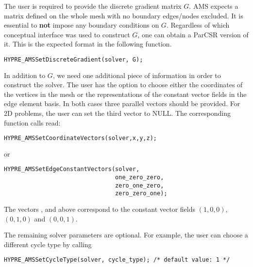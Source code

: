 The user is required to provide the discrete gradient matrix $G$.
AMS expects a matrix defined on the whole mesh with no
boundary edges/nodes excluded. It is essential to {\bf not} impose any boundary
conditions on $G$.
Regardless of which \hypre{} conceptual interface was used to construct $G$,
one can obtain a ParCSR version of it. This is the expected
format in the following function.
\begin{display}\begin{verbatim}
HYPRE_AMSSetDiscreteGradient(solver, G);
\end{verbatim}\end{display}

In addition to $G$, we need one additional piece of information in order
to construct the solver.
The user has the option to choose either the coordinates of the vertices
in the mesh or the representations of the constant vector fields
in the edge element basis.
In both cases three \hypre{} parallel vectors should be provided.
For 2D problems, the user can set the third vector to NULL.
The corresponding function calls read:
\begin{display}\begin{verbatim}
HYPRE_AMSSetCoordinateVectors(solver,x,y,z);
\end{verbatim}\end{display}
or
\begin{display}\begin{verbatim}
HYPRE_AMSSetEdgeConstantVectors(solver,
                                one_zero_zero,
                                zero_one_zero,
                                zero_zero_one);
\end{verbatim}\end{display}
The vectors ,  and 
above correspond to the constant vector fields $(1,0,0)$, $(0,1,0)$ and $(0,0,1)$.

The remaining solver parameters are optional.
For example, the user can choose a different cycle type by calling
\begin{display}\begin{verbatim}
HYPRE_AMSSetCycleType(solver, cycle_type); /* default value: 1 */
\end{verbatim}\end{display}

